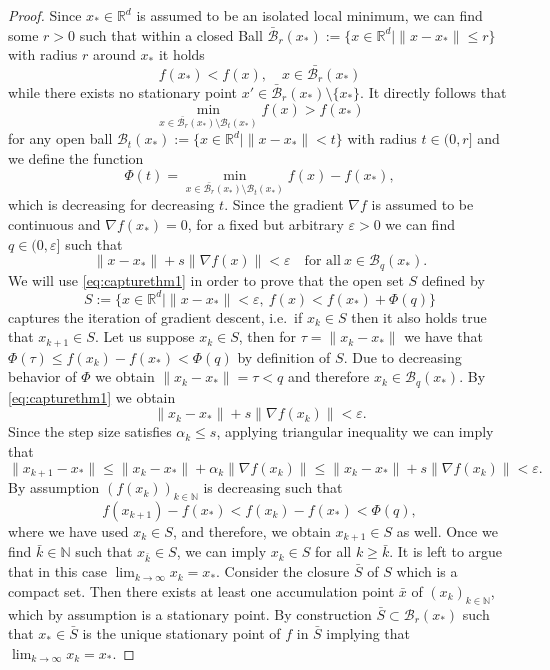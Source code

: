 \documentclass[12pt,openany]{book}
\theoremstyle{definition}
\theoremstyle{definition}
\newcommand{\N}{\mathbb{N}}
\newcommand{\R}{\mathbb{R}}
\begin{document}
\begin{proof}
Since $x_\ast\in\R^d$ is assumed to be an isolated local minimum,  we can find some $r>0$ such that within a closed Ball $\bar{\mathcal B}_{r}(x_\ast):= \{x\in\R^d\mid \|x-x_\ast\|\le r\}$ with radius $r$ around $x_\ast$ it holds
\[f(x_\ast) < f(x),\quad x\in\bar{\mathcal B_{r}}(x_\ast)\]
while there exists no stationary point $x'\in \bar{\mathcal B}_{r}(x_\ast)\setminus \{x_\ast\}$. It directly follows that 
\[\min_{x\in \bar{\mathcal B_{r}}(x_\ast)\setminus \mathcal B_{t}(x_\ast)} f(x) > f(x_\ast)\]
for any open ball $\mathcal B_t(x_\ast):=\{x\in\R^d\mid \|x-x_\ast\|<t\}$ with radius $t\in(0,r]$ and we define the function
\[\Phi(t) = \min_{x\in \bar{\mathcal B_{r}}(x_\ast)\setminus \mathcal B_{t}(x_\ast)} f(x) - f(x_\ast),\]
which is decreasing for decreasing $t$. Since the gradient $\nabla f$ is assumed to be continuous and $\nabla f(x_\ast)=0$, for a fixed but arbitrary $\varepsilon>0$ we can find $q\in(0,\varepsilon]$ such that
\begin{equation}\label{eq:capturethm1}
\|x-x_\ast\| + s \|\nabla f(x)\| < \varepsilon \quad \text{for all}\ x\in \mathcal B_q(x_\ast).
\end{equation}
We will use \eqref{eq:capturethm1} in order to prove that the open set $S$ defined by
\[S:=\{x\in\R^d\mid \|x-x_\ast\|<\varepsilon,\ f(x)<f(x_\ast) + \Phi(q)\} \]
captures the iteration of gradient descent, i.e.~if $x_k\in S$ then it also holds true that $x_{k+1}\in S$. Let us suppose $x_k\in S$, then for $\tau = \|x_k-x_\ast\|$ we have that $\Phi(\tau) \le f(x_k)-f(x_\ast)<\Phi(q)$ by definition of $S$. Due to decreasing behavior of $\Phi$ we obtain $\|x_k-x_\ast\|=\tau<q$ and therefore $x_k\in\mathcal B_q(x_\ast)$. By \eqref{eq:capturethm1} we obtain 
\[\|x_k-x_\ast\|+s\|\nabla f(x_k)\|<\varepsilon. \]
Since the step size satisfies $\alpha_k\le s$, applying triangular inequality we can imply that
\[\|x_{k+1}-x_\ast\|\le \|x_k-x_\ast\| + \alpha_k \|\nabla f(x_k)\| \le \|x_k-x_\ast\| + s\|\nabla f(x_k)\| < \varepsilon. \]
By assumption $(f(x_k))_{k\in\N}$ is decreasing such that
\[f(x_{k+1}) - f(x_\ast) < f(x_k) - f(x_\ast) < \Phi(q), \]
where we have used $x_k\in S$, and therefore,  we obtain $x_{k+1}\in S$ as well.  Once we find $\bar k\in \N$ such that $x_{\bar k}\in S$, we can imply $x_k\in S$ for all $k\ge \bar k$. It is left to argue that in this case $\lim_{k\to\infty} x_k = x_\ast$. Consider the closure $\bar S$ of $S$ which is a compact set. Then there exists at least one accumulation point $\bar x$ of $(x_k)_{k\in\N}$, which by assumption is a stationary point.  By construction $\bar S\subset \mathcal B_r(x_\ast)$ such that $x_\ast\in\bar S$ is the unique stationary point of $f$ in $\bar S$ implying that $\lim_{k\to\infty} x_k = x_\ast$. 
\end{proof}
\end{document}
